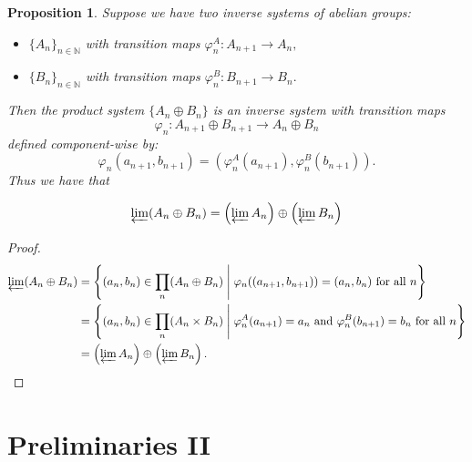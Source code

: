 \documentclass{article}
\newtheorem{prop}{Proposition}[section]
\theoremstyle{definition}
\theoremstyle{definition}
\theoremstyle{definition}
\newcommand{\tate}{\operatorname{Tate_{\ell}}}
\newcommand{\Z}{\mathbb{Z}}
\newcommand{\N}{\mathbb{N}}
\begin{document}
\begin{prop}
    
  
  
  Suppose we have two inverse systems of abelian groups:
  \begin{itemize}
     \item $\{A_n\}_{n\in \N}$ with transition maps $\varphi^A_n:A_{n+1}\to A_n,$
    \item $\{B_n\}_{n\in \N}$ with transition maps $\varphi^B_n:B_{n+1}\to B_n.$
  \end{itemize}
  Then the product system $\{ A_n \oplus B_n\}$ is an inverse system with transition maps $$
\varphi_n : A_{n+1} \oplus B_{n+1} \longrightarrow A_n \oplus B_n$$ defined component-wise by: $$\varphi_n(a_{n+1}, b_{n+1}) = \left( \varphi_n^A(a_{n+1}), \varphi_n^B(b_{n+1}) \right).$$
Thus we have that

$$\varprojlim (A_n \oplus B_n)=\left( \varprojlim A_n \right) \oplus \left( \varprojlim B_n \right)$$

\end{prop}
\begin{proof}
    
\begin{align*}
\varprojlim (A_n \oplus B_n) 
&= \left\{ (a_n, b_n) \in \prod_n (A_n \oplus B_n) \;\middle|\; \varphi_n((a_{n+1}, b_{n+1})) = (a_n, b_n) \text{ for all } n \right\} \\
&= \left\{ (a_n, b_n) \in \prod_n (A_n \times B_n )\;\middle|\; \varphi_n^A(a_{n+1}) = a_n \text{ and } \varphi_n^B(b_{n+1}) = b_n \text{ for all } n \right\} \\
&= \left( \varprojlim A_n \right) \oplus \left( \varprojlim B_n \right).
\end{align*}

\end{proof}






\section{Preliminaries II}
\end{document}
